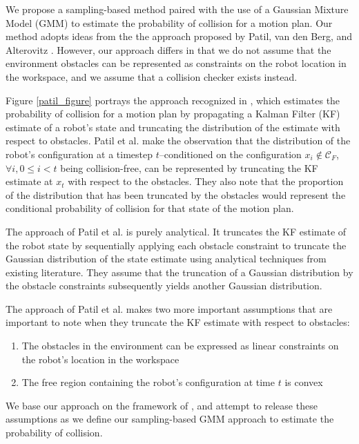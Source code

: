 \documentclass[journal]{IEEEtran}
\begin{document}
We propose a sampling-based method paired with the use of a Gaussian Mixture Model (GMM) to estimate the probability of collision for a motion plan. Our method adopts ideas from the the approach proposed by Patil, van den Berg, and Alterovitz \cite{IEEEhowto:patil}. However, our approach differs in that we do not assume that the environment obstacles can be represented as constraints on the robot location in the workspace, and we assume that a collision checker exists instead.

Figure \ref{patil_figure} portrays the approach recognized in \cite{IEEEhowto:patil}, which estimates the probability of collision for a motion plan by propagating a Kalman Filter (KF) estimate of a robot's state and truncating the distribution of the estimate with respect to obstacles. Patil et al. make the observation that the distribution of the robot's configuration at a timestep $t$--conditioned on the configuration $x_i \notin \mathcal{C}_F$, $\forall i, 0 \leq i < t $ being collision-free, can be represented by truncating the KF estimate at $x_t$ with respect to the obstacles. They also note that the proportion of the distribution that has been truncated by the obstacles would represent the conditional probability of collision for that state of the motion plan.

The approach of Patil et al. is purely analytical. It truncates the KF estimate of the robot state by sequentially applying each obstacle constraint to truncate the Gaussian distribution of the state estimate using analytical techniques from existing literature. They assume that the truncation of a Gaussian distribution by the obstacle constraints subsequently yields another Gaussian distribution.

The approach of Patil et al. makes two more important assumptions that are important to note when they truncate the KF estimate with respect to obstacles:
\begin{enumerate}
  \item The obstacles in the environment can be expressed as linear constraints on the robot's location in the workspace
  \item The free region containing the robot's configuration at time $t$ is convex
\end{enumerate}

We base our approach on the framework of \cite{IEEEhowto:patil}, and attempt to release these assumptions as we define our sampling-based GMM approach to estimate the probability of collision.
\end{document}
